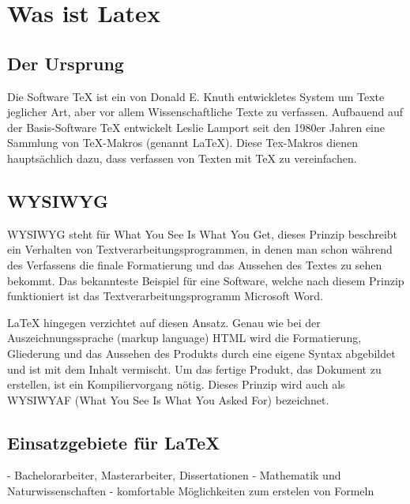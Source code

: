 \chapter{Was ist Latex}
 \section{Der Ursprung}
 Die Software TeX ist ein von Donald E. Knuth entwickletes System um Texte jeglicher Art, aber vor allem Wissenschaftliche Texte zu verfassen. Aufbauend auf der Basis-Software TeX entwickelt Leslie Lamport seit den 1980er Jahren eine Sammlung von TeX-Makros (genannt LaTeX). Diese Tex-Makros dienen hauptsächlich dazu, dass verfassen von Texten mit TeX zu vereinfachen.

 \section{WYSIWYG}
 WYSIWYG steht für What You See Is What You Get, dieses Prinzip beschreibt ein Verhalten von Textverarbeitungsprogrammen, in denen man schon während des Verfassens die finale Formatierung und das Aussehen des Textes zu sehen bekommt. Das bekannteste Beispiel für eine Software, welche nach diesem Prinzip funktioniert ist das Textverarbeitungsprogramm Microsoft Word.

 LaTeX hingegen verzichtet auf diesen Ansatz. Genau wie bei der Auszeichnungssprache (markup language) HTML wird die Formatierung, Gliederung und das Aussehen des Produkts durch eine eigene Syntax abgebildet und ist mit dem Inhalt vermischt. Um das fertige Produkt, das Dokument zu erstellen, ist ein Kompiliervorgang nötig. Dieses Prinzip wird auch als WYSIWYAF (What You See Is What You Asked For) bezeichnet.

\section{Einsatzgebiete für LaTeX}
- Bachelorarbeiter, Masterarbeiter, Dissertationen
- Mathematik und Naturwissenschaften
- komfortable Möglichkeiten zum erstelen von Formeln
